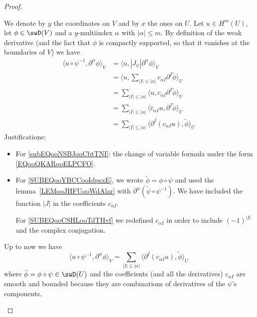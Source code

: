 \begin{proof}
\begin{subproof}
        We denote by \( y\) the coordinates on \( V\) and by \( x\) the ones on \( U\). Let \( u\in H^m(U)\), let \( \phi\in\swD(V)\) and a \( y\)-multiindex \( \alpha\) with \( | \alpha |\leq m\). By definition of the weak derivative (and the fact that \( \phi\) is compactly supported, so that it vanishes at the boundaries of \( V\)) we have
        \begin{subequations}
            \begin{align}
                \langle u\circ\psi^{-1}, \partial^{\alpha}\phi\rangle_V &=\langle u, | J_{\psi}| \partial^{\alpha}\phi \rangle_V   \label{subEQooNSBJooCbtTNI}    \\
                &=\langle u, \sum_{| I |\leq | \alpha |}c_{\alpha I}\partial^I\tilde \phi\rangle_U  \label{SUBEQooYBCCooIdpsxE}   \\
                    &=\sum_{ |I|\leq |\alpha|}\langle u, c_{\alpha I}\partial^{ I}\tilde\phi\rangle_U \\
                    &=\sum_{ |I|\leq |\alpha|}\langle \bar c_{\alpha I}u, \partial^{ I}\tilde \phi\rangle_U\\
                    &=\sum_{ |I|\leq |\alpha|}\langle \partial^{ I}(c_{\alpha I}u), \tilde \phi\rangle_U       \label{SUBEQooCSHLooTdTHvf}
            \end{align}
        \end{subequations}
        Justifications:
        \begin{itemize}
            \item
                For \eqref{subEQooNSBJooCbtTNI}: the change of variable formula under the form \eqref{EQooQKARooELPCFO}.
            \item
                For \eqref{SUBEQooYBCCooIdpsxE}, we wrote \( \tilde \phi=\phi\circ\psi\) and used the lemma~\ref{LEMooJHFUooWdAlar} with \( \partial^{\alpha}(\tilde \psi\circ\psi^{-1})\). We have included the function \( | J |\) in the coefficients \( c_{\alpha I}\).

    \spitem
        For \eqref{SUBEQooCSHLooTdTHvf} we redefined \( c_{\alpha I}\) in order to include \( (-1)^{|  I |}\) and the complex conjugation.

        \end{itemize}

        Up to now we have
        \begin{equation}
          \langle u\circ\psi^{-1}, \partial^{\alpha}\phi\rangle_V =  \sum_{| I |\leq | \alpha |}\langle \partial^{I}(c_{\alpha I}u), \tilde \phi\rangle_U
        \end{equation}
        where \( \tilde \phi=\phi\circ\psi\in \swD(U)\) and the coefficients (and all the derivatives) \( c_{\alpha I}\) are smooth and bounded because they are combinations of derivatives of the \( \psi\)'s components.


\end{subproof}
\end{proof}
